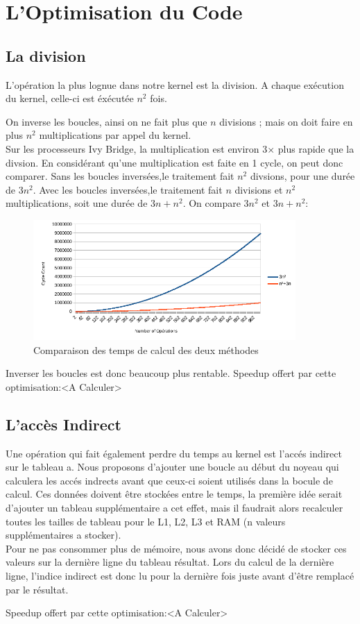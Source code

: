 

\chapter*{L'Optimisation du Code}
\section*{La division}

L'opération la plus lognue dans notre kernel est la division. A chaque exécution du kernel, celle-ci est éxécutée $n^2$ fois.

On inverse les boucles, ainsi on ne fait plus que $n$ divisions ; mais on doit faire en plus $n^2$ multiplications par appel du kernel.
\\Sur les processeurs Ivy Bridge, la multiplication est environ 3$\times$ plus rapide que la divsion. En considérant qu'une multiplication est faite en 1 cycle, on peut donc comparer.
Sans les boucles inversées,le traitement fait $n^2$ divsions, pour une durée de $3n^2$.
Avec les boucles inversées,le traitement fait $n$ divisions et $n^2$ multiplications, soit une durée de $3n+n^2$.
On compare $3n^2$ et $3n+n^2$:\\
\begin{figure}[ht!]
    \centering
    \includegraphics[width=100mm]{MEDIA/div_vs_mult_graph.png}
    \caption{Comparaison des temps de calcul des deux méthodes}
\end{figure}
Inverser les boucles est donc beaucoup plus rentable.
Speedup offert par cette optimisation:<A Calculer>

\section*{L'accès Indirect}

Une opération qui fait également perdre du temps au kernel est l'accés indirect sur le tableau a.
Nous proposons d'ajouter une boucle au début du noyeau qui calculera les accés indrects avant que ceux-ci soient utilisés dans la bocule de calcul.
Ces données doivent être stockées entre le temps, la première idée serait d'ajouter un tableau supplémentaire a cet effet, mais il faudrait alors recalculer toutes les tailles de tableau pour le L1, L2, L3 et RAM (n valeurs supplémentaires a stocker).\\

Pour ne pas consommer plus de mémoire, nous avons donc décidé de stocker ces valeurs sur la dernière ligne du tableau résultat.
Lors du calcul de la dernière ligne, l'indice indirect est donc lu pour la dernière fois juste avant d'être remplacé par le résultat. 

Speedup offert par cette optimisation:<A Calculer>

